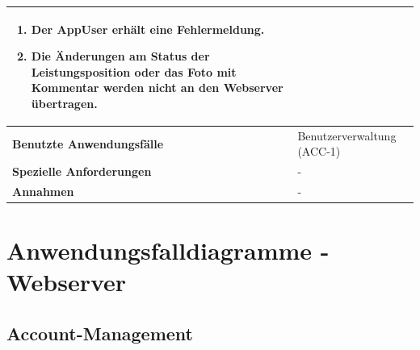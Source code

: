 \begin{longtable}[c]{|p{4cm}|p{10cm}|}
\begin{enumerate}
        \item Der AppUser erh\"alt eine Fehlermeldung.
        \item Die \"Anderungen am Status der Leistungsposition oder das Foto mit Kommentar werden nicht an den Webserver \"ubertragen.
    \end{enumerate}                                                                                                                                                                                                                                                                                                                              \\ \hline
    \textbf{Benutzte Anwendungsfälle}   & Benutzerverwaltung (ACC-1)                                                                                                                                                                                                                                                                                        \\ \hline
    \textbf{Spezielle Anforderungen}    & -                                                                                                                                                                                                                                                                                                                 \\ \hline
    \textbf{Annahmen}                   & -                                                                                                                                                                                                                                                                                                                 \\ \hline
\end{longtable}

\clearpage

\section{Anwendungsfalldiagramme - Webserver}

\subsection{Account-Management}

